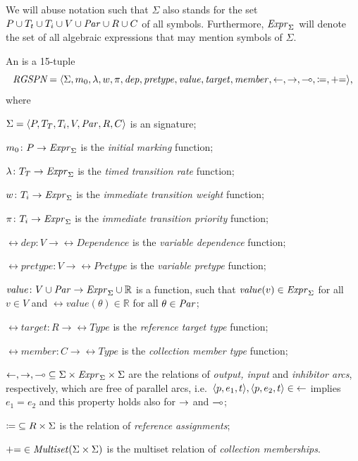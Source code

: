 We will abuse notation such that \(\Sigma\) also stands for the set \(P \cup T_t \cup T_i \cup V \cup \textrm{\itshape Par\/} \cup R \cup C\) of all symbols. Furthermore, \(\textrm{\itshape Expr\/}_\Sigma\) will denote the set of all algebraic expressions that may mention symbols of \(\Sigma\).

\begin{dfn}
  An \emph{} is a 15-tuple
  \begin{equation}
    \textit{RGSPN} = \langle \Sigma, m_0, \lambda, w, \pi, \textrm{\itshape dep\/}, \textrm{\itshape pretype\/}, \textrm{\itshape value\/}, \textrm{\itshape target\/}, \textrm{\itshape member\/}, {\leftarrow}, {\rightarrow}, {\multimap}, {\coloneq}, {\mathrel{{+}{=}}} \rangle \text,
  \end{equation}
  where
  \begin{compactitem}
  \item \(\Sigma = \langle P, T_T, T_i, V, \textrm{\itshape Par\/}, R, C \rangle\) is an  signature;
  \item \(m_0 \colon P \rightarrow \textrm{\itshape Expr\/}_\Sigma\) is the \emph{initial marking} function;
  \item \(\lambda \colon T_T \rightarrow \textrm{\itshape Expr\/}_\Sigma\) is the \emph{timed transition rate} function;
  \item \(w\colon T_i \rightarrow \textrm{\itshape Expr\/}_\Sigma\) is the \emph{immediate transition weight} function;
  \item \(\pi\colon T_i \rightarrow \textrm{\itshape Expr\/}_\Sigma\) is the \emph{immediate transition priority} function;
  \item \(\rel{dep}\colon V \to \rel{Dependence}\) is the \emph{variable dependence} function;
  \item \(\rel{pretype}\colon V \to \rel{Pretype}\) is the \emph{variable pretype} function;
  \item \(\textrm{\itshape value\/}\colon V \cup \textrm{\itshape Par\/} \rightarrow \textrm{\itshape Expr\/}_\Sigma \cup \mathbb{R}\) is a function, such that \(\textrm{\itshape value\/}(v) \in \textrm{\itshape Expr\/}_\Sigma\) for all \(v \in V\) and \(\rel{value}(\theta) \in \mathbb{R}\) for all \(\theta \in \textrm{\itshape Par\/}\);
  \item \(\rel{target}\colon R \to \rel{Type}\) is the \emph{reference target type} function;
  \item \(\rel{member}\colon C \to \rel{Type}\) is the \emph{collection member type} function;
  \item \({\leftarrow}, {\rightarrow}, {\multimap} \subseteq \Sigma \times \textrm{\itshape Expr\/}_\Sigma \times \Sigma\) are the relations of \emph{output, input} and \emph{inhibitor arcs}, respectively, which are free of parallel arcs, i.e.~\(\langle p, e_1, t \rangle, \langle p, e_2, t \rangle \in {\leftarrow}\) implies \(e_1 = e_2\) and this property holds also for \(\rightarrow\) and \(\multimap\);
  \item \({\coloneq} \subseteq R \times \Sigma\) is the relation of \emph{reference assignments};
  \item \({\mathrel{{+}{=}}} \in \textrm{\itshape Multiset\/}(\Sigma \times \Sigma)\) is the multiset relation of \emph{collection memberships}.
  \end{compactitem}
\end{dfn}

